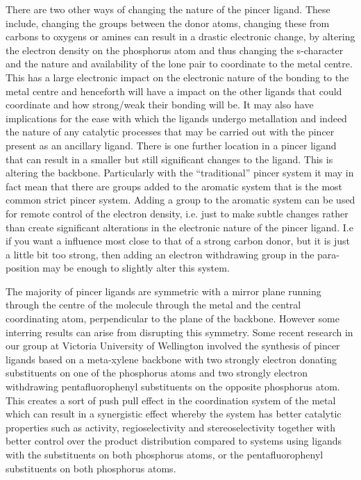 There are two other ways of changing the nature of the pincer ligand.  These include, changing the groups between the donor atoms, changing these from carbons to oxygens or amines can result in a drastic electronic change, by altering the electron density on the phosphorus atom and thus changing the s-character and the nature and availability of the lone pair to coordinate to the metal centre.  This has a large electronic impact on the electronic nature of the bonding to the metal centre and henceforth will have a impact on the other ligands that could coordinate and how strong/weak their bonding will be.  It may also have implications for the ease with which the ligands undergo metallation and indeed the nature of any catalytic processes that may be carried out with the pincer present as an ancillary ligand.  There is one further location in a pincer ligand that can result in a smaller but still significant changes to the ligand.  This is altering the backbone.  Particularly with the ``traditional'' pincer system it may in fact mean that there are groups added to the aromatic system that is the most common strict pincer system.  Adding a group to the aromatic system can be used for remote control of the electron density, i.e. just to make subtle changes rather than create significant alterations in the electronic nature of the pincer ligand.  I.e if you want a \trans{} influence most close to that of a strong carbon donor, but it is just a little bit too strong, then adding an electron withdrawing group in the para-position may be enough to slightly alter this system.  

The majority of pincer ligands are symmetric with a mirror plane running through the centre of the molecule through the metal and the central coordinating atom, perpendicular to the plane of the backbone.  However some interring results can arise from disrupting this symmetry.  Some recent research in our group at Victoria University of Wellington involved the synthesis of pincer ligands based on a meta-xylene backbone with two strongly electron donating \tBu{} substituents on one of the phosphorus atoms and two strongly electron withdrawing pentafluorophenyl substituents on the opposite phosphorus atom.  This creates a sort of push pull effect in the coordination system of the metal which can result in a synergistic effect whereby the system has better catalytic properties such as activity, regioselectivity and stereoselectivity together with better control over the product distribution compared to systems using ligands with the \tBu{} substituents on both phosphorus atoms, or the pentafluorophenyl substituents on both phosphorus atoms.  

